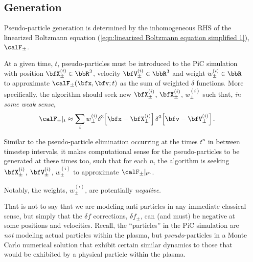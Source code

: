 \subsection*{Generation}
    Pseudo-particle generation is determined by the inhomogeneous RHS of the linearized Boltzmann equation (\ref{eqn:linearized Boltzmann equation simplified 1}), $\calF_{\pm}$.
    
    At a given time, $t$, pseudo-particles must be introduced to the PiC simulation with position $\bfX_{\pm}^{(i)} \in \bbR^{3}$, velocity $\bfV_{\pm}^{(i)} \in \bbR^{3}$ and weight $w_{\pm}^{(i)} \in \bbR$ to approximate $\calF_{\pm}(\bfx, \bfv; t)$ as the sum of weighted $\delta$ functions. More specifically, the algorithm should seek new $\bfX_{\pm}^{(i)}$, $\bfX_{\pm}^{(i)}$, $w_{\pm}^{(i)}$ such that, \emph{in some weak sense},
    \begin{equation}\label{eqn:particle generation approximation}
        \calF_{\pm}|_{t}  \approx  \sum_{i}w_{\pm}^{(i)}\delta^{3}\!\left[\bfx - \bfX_{\pm}^{(i)}\right]\delta^{3}\!\left[\bfv - \bfV_{\pm}^{(i)}\right].
    \end{equation}

    Similar to the pseudo-particle elimination occurring at the times $t^{n}$ in between timestep intervals, it makes computational sense for the pseudo-particles to be generated at these times too, such that for each $n$, the algorithm is seeking $\bfX_{\pm}^{(i)}$, $\bfV_{\pm}^{(i)}$, $w_{\pm}^{(i)}$ to approximate $\calF_{\pm}|_{t^{n}}$.

    \shortline

    \begin{remark}
        Notably, the weights, $w_{\pm}^{(i)}$, are potentially \emph{negative}.
        
        That is not to say that we are modeling anti-particles in any immediate classical sense, but simply that the $\delta\!f$ corrections, $\delta\!f_{\pm}$, can (and must) be negative at some positions and velocities. Recall, the ``particles'' in the PiC simulation are \emph{not} modeling actual particles within the plasma, but \emph{pseudo}-particles in a Monte Carlo numerical solution that exhibit certain similar dynamics to those that would be exhibited by a physical particle within the plasma.
    \end{remark}

